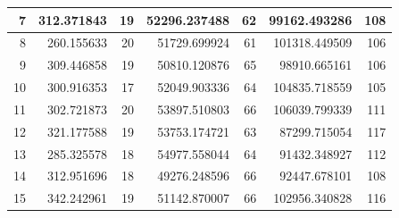 \begin{table}
\begin{adjustwidth}{}{}
{{\begin{tabular}{|r|r|r|r|r|r|r|}
					\hline
					7                                          & 312.371843                   & 19                                    & 52296.237488                   & 62                                    & 99162.493286                 & 108                                    \\ 
					\hline
					8                                          & 260.155633                   & 20                                    & 51729.699924                   & 61                                    & 101318.449509                & 106                                    \\ 
					\hline
					9                                          & 309.446858                   & 19                                    & 50810.120876                   & 65                                    & 98910.665161                 & 106                                    \\ 
					\hline
					10                                         & 300.916353                   & 17                                    & 52049.903336                   & 64                                    & 104835.718559                & 105                                    \\ 
					\hline
					11                                         & 302.721873                   & 20                                    & 53897.510803                   & 66                                    & 106039.799339                & 111                                    \\ 
					\hline
					12                                         & 321.177588                   & 19                                    & 53753.174721                   & 63                                    & 87299.715054                 & 117                                    \\ 
					\hline
					13                                         & 285.325578                   & 18                                    & 54977.558044                   & 64                                    & 91432.348927                 & 112                                    \\ 
					\hline
					14                                         & 312.951696                   & 18                                    & 49276.248596                   & 66                                    & 92447.678101                 & 108                                    \\ 
					\hline
					15                                         & 342.242961                   & 19                                    & 51142.870007                   & 66                                    & 102956.340828                & 116                                    \\ 

\end{tabular}}}
\end{adjustwidth}
\end{table}
